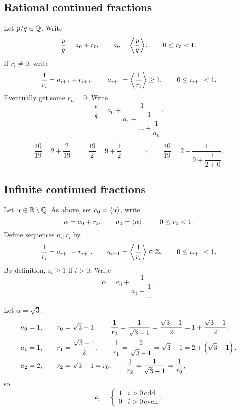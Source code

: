 \subsection{Rational continued fractions}

Let $ p / q \in \mathbb{Q} $. Write
$$ \dfrac{p}{q} = a_0 + r_0, \qquad a_0 = \left\langle \dfrac{p}{q} \right\rangle, \qquad 0 \le r_0 < 1. $$
If $ r_i \ne 0 $, write
$$ \dfrac{1}{r_i} = a_{i + 1} + r_{i + 1}, \qquad a_{i + 1} = \left\langle \dfrac{1}{r_i} \right\rangle \ge 1, \qquad 0 \le r_{i + 1} < 1. $$
Eventually get some $ r_n = 0 $. Write
$$ \dfrac{p}{q} = a_0 + \dfrac{1}{a_1 + \dfrac{1}{\dots + \dfrac{1}{a_n}}}. $$

\begin{example*}
$$ \dfrac{40}{19} = 2 + \dfrac{2}{19}, \qquad \dfrac{19}{2} = 9 + \dfrac{1}{2} \qquad \implies \qquad \dfrac{40}{19} = 2 + \dfrac{1}{9 + \dfrac{1}{2 + 0}}. $$
\end{example*}

\subsection{Infinite continued fractions}

Let $ \alpha \in \mathbb{R} \setminus \mathbb{Q} $. As above, set $ a_0 = \left\langle \alpha \right\rangle $, write
$$ \alpha = a_0 + r_0, \qquad a_0 = \left\langle \alpha \right\rangle, \qquad 0 \le r_0 < 1. $$
Define sequences $ a_i, r_i $ by
$$ \dfrac{1}{r_i} = a_{i + 1} + r_{i + 1}, \qquad a_{i + 1} = \left\langle \dfrac{1}{r_i} \right\rangle \in \mathbb{Z}, \qquad 0 \le r_{i + 1} < 1. $$
By definition, $ a_i \ge 1 $ if $ i > 0 $. Write
$$ \alpha = a_0 + \dfrac{1}{a_1 + \dfrac{1}{\dots}}. $$

\begin{example*}
Let $ \alpha = \sqrt{3} $.
\begin{align*}
& a_0 = 1, \qquad r_0 = \sqrt{3} - 1, \qquad \dfrac{1}{r_0} = \dfrac{1}{\sqrt{3} - 1} = \dfrac{\sqrt{3} + 1}{2} = 1 + \dfrac{\sqrt{3} - 1}{2}. \\
& a_1 = 1, \qquad r_1 = \dfrac{\sqrt{3} - 1}{2}, \qquad \dfrac{1}{r_1} = \dfrac{2}{\sqrt{3} - 1} = \sqrt{3} + 1 = 2 + \left( \sqrt{3} - 1 \right). \\
& a_2 = 2, \qquad r_2 = \sqrt{3} - 1 = r_0, \qquad \dfrac{1}{r_2} = \dfrac{1}{\sqrt{3} - 1} = \dfrac{1}{r_0},
\end{align*}
so
$$ a_i =
\begin{cases}
1 & i > 0 \ \text{odd} \\
0 & i > 0 \ \text{even}
\end{cases}.
$$
\end{example*}

